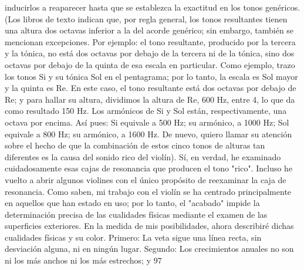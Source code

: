 inducirlos a reaparecer hasta que se establezca la exactitud en los tonos genéricos. (Los libros de texto indican que, por regla general, los tonos resultantes tienen una altura dos octavas inferior a la del acorde genérico; sin embargo, también se mencionan excepciones. Por ejemplo: el tono resultante, producido por la tercera y la tónica, no está dos octavas por debajo de la tercera ni de la tónica, sino dos octavas por debajo de la quinta de esa escala en particular. Como ejemplo, trazo los tonos Si y su tónica Sol en el pentagrama; por lo tanto, la escala es Sol mayor y la quinta es Re. En este caso, el tono resultante está dos octavas por debajo de Re; y para hallar su altura, dividimos la altura de Re, 600 Hz, entre 4, lo que da como resultado 150 Hz. Los armónicos de Si y Sol están, respectivamente, una octava por encima. Así pues: Si equivale a 500 Hz; su armónico, a 1000 Hz; Sol equivale a 800 Hz; su armónico, a 1600 Hz. De nuevo, quiero llamar su atención sobre el hecho de que la combinación de estos cinco tonos de alturas tan diferentes es la causa del sonido rico del violín).
Sí, en verdad, he examinado cuidadosamente esas cajas de resonancia que producen el tono "rico". Incluso he vuelto a abrir algunos violines con el único propósito de reexaminar la caja de resonancia. Como saben, mi trabajo con el violín se ha centrado principalmente en aquellos que han estado en uso; por lo tanto, el "acabado" impide la determinación precisa de las cualidades físicas mediante el examen de las superficies exteriores. En la medida de mis posibilidades, ahora describiré dichas cualidades físicas y su color. Primero: La veta sigue una línea recta, sin desviación alguna, ni en ningún lugar. Segundo: Los crecimientos anuales no son ni los más anchos ni los más estrechos; y
97

